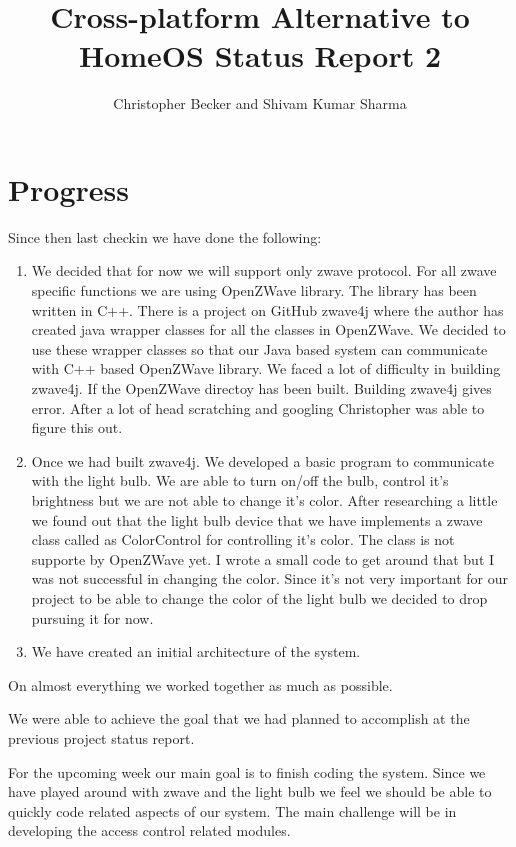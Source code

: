 \documentclass[letterpaper,12pt]{article}
\title{Cross-platform Alternative to HomeOS Status Report 2}
\author{Christopher Becker and Shivam Kumar Sharma}
\begin{document}
\maketitle

\section*{Progress}
Since then last checkin we have done the following:
\begin{enumerate}
 \item We decided that for now we will support only zwave protocol. For all zwave specific functions we are using OpenZWave library. The library has been written in C++. There is a project on GitHub zwave4j where the author has created java wrapper classes for all the classes in OpenZWave. We decided to use these wrapper classes so that our Java based system can communicate with C++ based OpenZWave library. We faced a lot of difficulty in building zwave4j. If the OpenZWave directoy has been built. Building zwave4j gives error. After a lot of head scratching and googling Christopher was able to figure this out.
 \item Once we had built zwave4j. We developed a basic program to communicate with the light bulb. We are able to turn on/off the bulb, control it's brightness but we are not able to change it's color. After researching a little we found out that the light bulb device that we have implements a zwave class called as ColorControl for controlling it's color. The class is not supporte by OpenZWave yet. I wrote a small code to get around that but I was not successful in changing the color. Since it's not very important for our project to be able to change the color of the light bulb we decided to drop pursuing it for now.
 \item We have created an initial architecture of the system.
\end{enumerate}
On almost everything we worked together as much as possible.

We were able to achieve the goal that we had planned to accomplish at the previous project status report.

For the upcoming week our main goal is to finish coding the system. Since we have played around with zwave and the light bulb we feel we should be able to quickly code related aspects of our system. The main challenge will be in developing the access control related modules.
\end{document}
